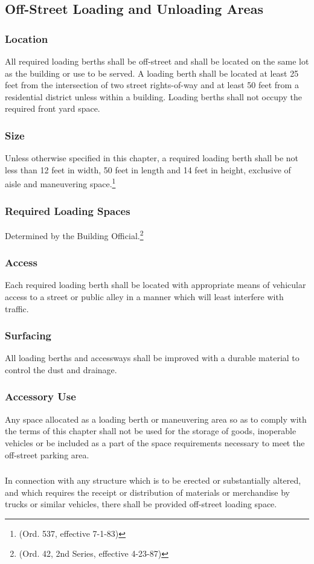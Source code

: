 \subsection{Off-Street Loading and Unloading Areas}
\subsubsection{Location}
All required loading berths shall be off-street and shall be located on the same lot as the building or use to be served. A loading berth shall be located at least 25 feet from the intersection of two street rights-of-way and at least 50 feet from a residential district unless within a building.  Loading berths shall not occupy the required front yard space.
\subsubsection{Size}
Unless otherwise specified in this chapter, a required loading berth shall be not less than 12 feet in width, 50 feet in length and 14 feet in height, exclusive of aisle and maneuvering space.\footnote{(Ord. 537, effective 7-1-83)}
\subsubsection{Required Loading Spaces}
Determined by the Building Official.\footnote{(Ord. 42, 2nd Series, effective 4-23-87)}
\subsubsection{Access}
Each required loading berth shall be located with appropriate means of vehicular access to a street or public alley in a manner which will least interfere with traffic.
\subsubsection{Surfacing}
All loading berths and accessways shall be improved with a durable material to control the dust and drainage.
\subsubsection{Accessory Use}
Any space allocated as a loading berth or maneuvering area so as to comply with the terms of this chapter shall not be used for the storage of goods, inoperable vehicles or be included as a part of the space requirements necessary to meet the off-street parking area.
\subsubsection{}
In connection with any structure which is to be erected or substantially altered, and which requires the receipt or distribution of materials or merchandise by trucks or similar vehicles, there shall be provided off-street loading space.
